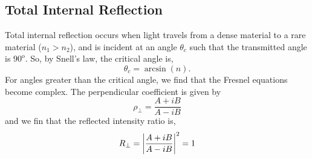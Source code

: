 \documentclass{book}
\begin{document}
\subsection{Total Internal Reflection}
Total internal reflection occurs when light travels from a dense material to a rare material ($n_1 > n_2$), and is incident at an angle $\theta_c$ such that the transmitted angle is $90^{\text{o}}$. So, by Snell's law, the critical angle is,
\begin{equation}
	\boxed{\theta_c = \arcsin\left(n\right)}.
\end{equation}
For angles greater than the critical angle, we find that the Fresnel equations become complex. The perpendicular coefficient is given by
\begin{equation}
	\rho_{\perp} = \frac{A + iB}{A - iB}
\end{equation}
and we fin that the reflected intensity ratio is,
\begin{equation}
	R_{\perp} = \abs{\frac{A+iB}{A-iB}}^2 = 1
\end{equation}
\end{document}
